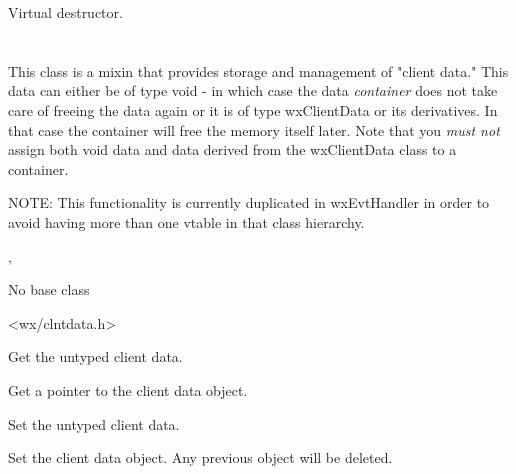 Virtual destructor.

\section{}\label{wxclientdatacontainer}

This class is a mixin that provides storage and management of "client
data." This data can either be of type void - in which case the data
{\it container} does not take care of freeing the data again
or it is of type wxClientData or its derivatives. In that case the
container will free the memory itself later.
Note that you {\it must not} assign both void data and data
derived from the wxClientData class to a container.

NOTE: This functionality is currently duplicated in wxEvtHandler in
order to avoid having more than one vtable in that class hierarchy.


, 


No base class


<wx/clntdata.h>






\label{wxclientdatacontainerwxclientdatacontainer}



\label{wxclientdatacontainerdtor}



\label{wxclientdatacontainergetclientdata}


Get the untyped client data.

\label{wxclientdatacontainergetclientobject}


Get a pointer to the client data object.

\label{wxclientdatacontainersetclientdata}


Set the untyped client data.

\label{wxclientdatacontainersetclientobject}


Set the client data object. Any previous object will be deleted.

